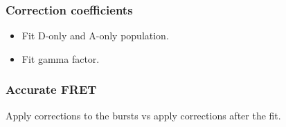 \subsubsection{Correction coefficients}

\begin{itemize}
\item Fit D-only and A-only population.
\item Fit gamma factor.
\end{itemize}


\subsubsection{Accurate FRET}

Apply corrections to the bursts vs apply corrections after the fit.

